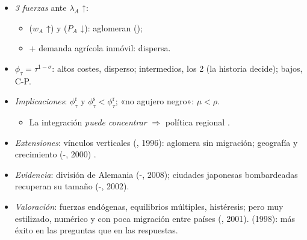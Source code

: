 \documentclass{article}
\begin{document}
\begin{columnas}
\begin{itemize}
\begin{itemize}
  \item Equilibrios:  ($\lambda_A=\frac12$) o  ($\lambda_A=0$ o $1$).
  \end{itemize}
\item \emph{3 fuerzas} ante $\lambda_A$ ↑:
  \begin{itemize}
  \item {} ($w_A$ ↑) y  ($P_A$ ↓): aglomeran ();
  \item {} + demanda agrícola inmóvil: dispersa.
  \end{itemize}
\item {} $\phi_\tau=\tau^{1-\sigma}$: altos costes, disperso; intermedios, los 2 (la historia decide); bajos, C-P.
\end{itemize}
\begin{itemize}
\item \emph{Implicaciones}:  $\phi^{\mathrm r}_\tau$ y  $\phi^{\mathrm s}_\tau<\phi^{\mathrm r}_\tau$; «no agujero negro»: $\mu<\rho$.
  \begin{itemize}
  \item La integración \emph{puede concentrar}  $\Rightarrow$ política regional .
  \end{itemize}
\item \emph{Extensiones}: vínculos verticales (, 1996): aglomera sin migración; geografía y crecimiento (-, 2000) .
\item \emph{Evidencia}: división de Alemania (-, 2008); ciudades japonesas bombardeadas recuperan su tamaño (-, 2002).
\item \emph{Valoración}: fuerzas endógenas, equilibrios múltiples, histéresis; pero muy estilizado, numérico y con poca migración entre países (, 2001).  (1998): más éxito en las preguntas que en las respuestas.
\end{itemize}


\end{columnas}
\end{document}
